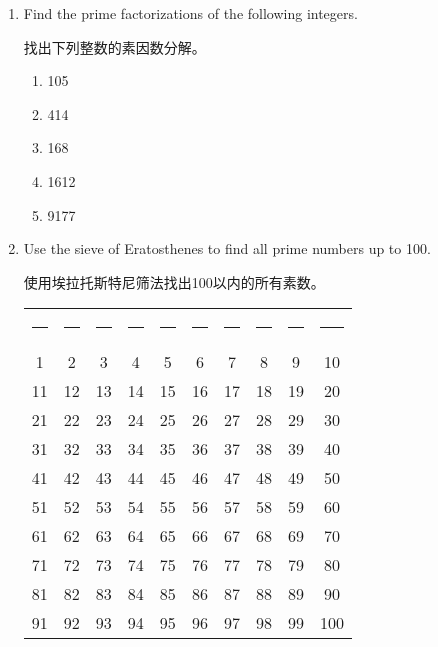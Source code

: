 \begin{enumerate}

  \item Find the prime factorizations of the following integers.
  
    找出下列整数的素因数分解。
  
    \begin{enumerate}
    \item 105
    \item 414
    \item 168
    \item 1612
    \item 9177
    \end{enumerate}
  
  
  \item Use the sieve of Eratosthenes to find all prime numbers
  up to 100.
  
  使用埃拉托斯特尼筛法找出100以内的所有素数。
  
  \begin{tabular}{cccccccccc}
  \rule{14pt}{0pt} & \rule{14pt}{0pt} & \rule{14pt}{0pt} &
  \rule{14pt}{0pt} & \rule{14pt}{0pt} & \rule{14pt}{0pt} & 
  \rule{14pt}{0pt} & \rule{14pt}{0pt} & \rule{14pt}{0pt} &
  \rule{14pt}{0pt} \\
   1 & 2 & 3 & 4 & 5 & 6 & 7 & 8 & 9 & 10 \\
   11 & 12 & 13 & 14 & 15 & 16 & 17 & 18 & 19 & 20 \\
   21 & 22 & 23 & 24 & 25 & 
   26 & 27 & 28 & 29 & 30 \\
   31 & 32 & 33 & 34 & 35 & 36 & 37 & 38 & 39 & 40 \\
   41 & 42 & 43 & 44 & 45 & 46 & 47 & 48 & 49 & 50 \\
   51 & 52 & 53 & 54 & 55 & 56 & 57 & 58 & 59 & 60 \\ 
   61 & 62 & 63 & 64 & 65 & 66 & 67 & 68 & 69 & 70 \\
   71 & 72 & 73 & 74 & 75 
   & 76 & 77 & 78 & 79 & 80 \\
   81 & 82 & 83 & 84 & 85 & 86 & 87 & 88 & 89 & 90 \\
   91 & 92 & 93 & 94 & 95 & 96 & 97 & 98 & 99 & 100
  \end{tabular}
  

\end{enumerate}
